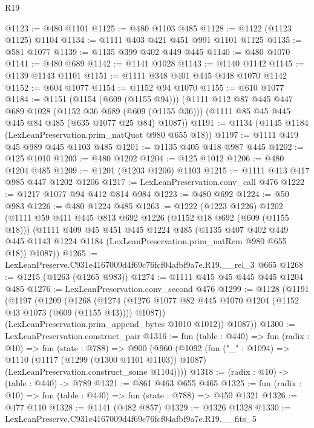 \begin{lexlean}{R19}
\begin{coremodule}
@1123 := @480 @1101
@1125 := @480 @1103 @485
@1128 := @1122 (@1123 @1125) @1104
@1134 := @1111 @403 @421 @451 @991 @1101 @1125
@1135 := @581 @1077
@1139 := @1135 @399 @402 @449 @445
@1140 := @480 @1070
@1141 := @480 @689
@1142 := @1141 @1028
@1143 := @1140 @1142
@1145 := @1139 @1143 @1101
@1151 := @1111 @348 @401 @445 @448 @1070 @1142
@1152 := @604 @1077
@1154 := @1152 @94 @1070
@1155 := @610 @1077
@1184 := @1151
    (@1154 (@609 (@1155 @94)))
    (@1111
      @112
      @87
      @445
      @447
      @689
      @1028
      (@1152 @36 @689 (@609 (@1155 @36)))
      (@1111 @85 @45 @445 @445 @84 @485 (@635 @1077 @25 @84) @1087))
@1191 := @1134 (@1145 @1184 (LexLeanPreservation.prim_natQuot @980 @655 @18))
@1197 := @1111 @419 @45 @989 @445 @1103 @485
@1201 := @1135 @405 @418 @987 @445
@1202 := @125 @1010
@1203 := @480 @1202
@1204 := @125 @1012
@1206 := @480 @1204 @485
@1209 := @1201 (@1203 @1206) @1103
@1215 := @1111 @413 @417 @985 @447 @1202 @1206
@1217 := LexLeanPreservation.conv_call @476
@1222 := @1217 @1077 @94 @412 @814 @984
@1223 := @480 @692
@1224 := @50 @983
@1226 := @480 @1224 @485
@1263 := @1222
    (@1223 @1226)
    @1202
    (@1111
      @59
      @411
      @445
      @813
      @692
      @1226
      (@1152 @18 @692 (@609 (@1155 @18)))
      (@1111
        @409
        @45
        @451
        @445
        @1224
        @485
        (@1135
          @407
          @402
          @449
          @445
          @1143
          @1224
          @1184
          (LexLeanPreservation.prim_natRem @980 @655 @18))
        @1087))
@1265 := LexLeanPreserve.C931e4167009d4f69c76fcf04afbf9a7e.R19.__rel_3 @665
@1268 := @1215 (@1263 (@1265 @983))
@1274 := @1111 @415 @45 @445 @445 @1204 @485
@1276 := LexLeanPreservation.conv_second @476
@1299 := @1128
    (@1191
      (@1197
        (@1209
          (@1268
            (@1274 (@1276 @1077 @82 @445 @1070 @1204 (@1152 @43 @1073 (@609 (@1155 @43)))) @1087))
          (LexLeanPreservation.prim_append_bytes @1010 @1012))
        @1087))
@1300 := LexLeanPreservation.construct_pair
@1316 := fun (table : @440) =>
  fun (radix : @10) =>
  fun (state : @788) =>
  @900
    (@960
      (@1092
        (fun ("_" : @1094) =>
        @1110
          (@1117 (@1299 (@1300 @1101 @1103)) @1087)
          (LexLeanPreservation.construct_some @1104))))
@1318 := (radix : @10) -> (table : @440) -> @789
@1321 := @861 @463 @655 @465
@1325 := fun (radix : @10) => fun (table : @440) => fun (state : @788) => @450 @1321
@1326 := @477 @110
@1328 := @1141 (@482 @857)
@1329 := @1326 @1328
@1330 := LexLeanPreserve.C931e4167009d4f69c76fcf04afbf9a7e.R19.__fits_5

\end{coremodule}
\end{lexlean}
